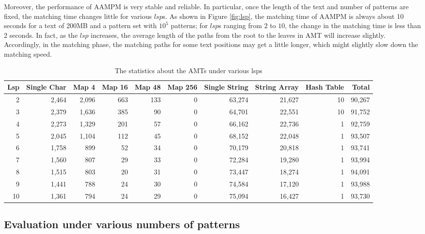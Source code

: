 \documentclass{article}
\begin{document}
Moreover, the performance of \textsf{AAMPM} is very stable and
reliable. In particular, once the length of the text and number of
patterns are fixed, the matching time changes little for various
$lsp$s. As shown in Figure \ref{fig:lsp}, the matching time of
\textsf{AAMPM} is always about 10 seconds for a text of 200MB and a
pattern set with $10^5$ patterns; for $lsp$s ranging from $2$ to $10$,
the change in the matching time is less than 2 seconds. In fact, as
the $lsp$ increases, the average length of the paths from the root to
the leaves in AMT will increase slightly. Accordingly, in the matching
phase, the matching paths for some text positions may get a little
longer, which might slightly slow down the matching speed.


\begin{table}[!htp]
  \centering
  \caption{The statistics about the AMTs under various lsps}
  \scriptsize
  \label{tab:node types}
  \begin{tabular}{rrrrrrrrrr}
 \hline
 Lsp &
 Single Char &
 Map 4 &
 Map 16 &
 Map 48 &
 Map 256 &
 Single String &
 String Array   &
 Hash Table &
 Total\\
 \hline
 2  & 2,464 & 2,096 & 663 & 133 & 0 & 63,274 &  21,627 & 10 & 90,267\\
 3  & 2,379 & 1,636 & 385 & 90  & 0 & 64,701 &  22,551 & 10 & 91,752\\
 4  & 2,273 & 1,329 & 201 & 57  & 0 & 66,162 &  22,736 &  1 & 92,759\\
 5  & 2,045 & 1,104 & 112 & 45  & 0 & 68,152 &  22,048 &  1 & 93,507\\
 6  & 1,758 &   899 &  52 & 34  & 0 & 70,179 &  20,818 &  1 & 93,741\\
 7  & 1,560 &   807 &  29 & 33  & 0 & 72,284 &  19,280 &  1 & 93,994\\
 8  & 1,515 &   803 &  20 & 31  & 0 & 73,447 &  18,274 &  1 & 94,091\\
 9  & 1,441 &   788 &  24 & 30  & 0 & 74,584 &  17,120 &  1 & 93,988\\
10  & 1,361 &   794 &  24 & 29  & 0 & 75,094 &  16,427 &  1 & 93,730\\
\hline
  \end{tabular}
\end{table}

\subsection{Evaluation under various numbers of patterns}
\end{document}
